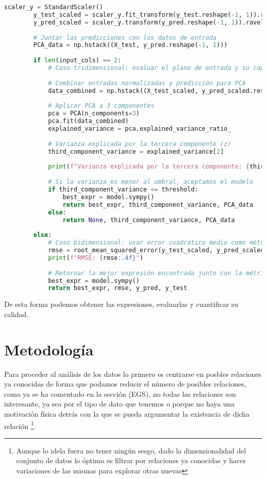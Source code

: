 \documentclass[11pt, a4paper]{article} %
\begin{document}
\begin{lstlisting}[language=Python, caption=Implementación del modelo de regresión simbólica, basicstyle=\tiny,label={code:1}]
        scaler_y = StandardScaler()
        y_test_scaled = scaler_y.fit_transform(y_test.reshape(-1, 1)).ravel()
        y_pred_scaled = scaler_y.transform(y_pred.reshape(-1, 1)).ravel()
    
        # Juntar las predicciones con los datos de entrada
        PCA_data = np.hstack((X_test, y_pred.reshape(-1, 1)))
    
        if len(input_cols) == 2:
            # Caso tridimensional: evaluar el plano de entrada y su capacidad explicativa
    
            # Combinar entradas normalizadas y predicción para PCA
            data_combined = np.hstack((X_test_scaled, y_pred_scaled.reshape(-1, 1)))
    
            # Aplicar PCA a 3 componentes
            pca = PCA(n_components=3)
            pca.fit(data_combined)
            explained_variance = pca.explained_variance_ratio_
    
            # Varianza explicada por la tercera componente (z)
            third_component_variance = explained_variance[2]
    
            print(f"Varianza explicada por la tercera componente: {third_component_variance:.4f}")
    
            # Si la varianza es menor al umbral, aceptamos el modelo
            if third_component_variance <= threshold:
                best_expr = model.sympy()
                return best_expr, third_component_variance, PCA_data
            else:
                return None, third_component_variance, PCA_data
    
        else:
            # Caso bidimensional: usar error cuadrático medio como métrica
            rmse = root_mean_squared_error(y_test_scaled, y_pred_scaled)
            print(f"RMSE: {rmse:.4f}")
    
            # Retornar la mejor expresión encontrada junto con la métrica
            best_expr = model.sympy()
            return best_expr, rmse, y_pred, y_test
    \end{lstlisting}

De esta forma podemos obtener las expresiones, evaluarlas y cuantificar su calidad.

\section{Metodología}

Para proceder al análisis de los datos lo primero es centrarse en posbles relaciones ya conocidas de forma que podamos reducir el número de posibles relaciones, como ya se ha comentado 
en la sección (EGS), no todas las relaciones son interesante, ya sea por el tipo de dato que tenemos o porque no haya una motivación física detrás con la que se pueda argumentar la existencia de dicha relación
\footnote{Aunque lo idela fuera no tener ningún sesgo, dado la dimensionalidad del conjunto de datos lo óptimo es filtrar por relaciones ya conocidas y hacer variaciones de las mismas para explorar otras nuevas}.
\end{document}
